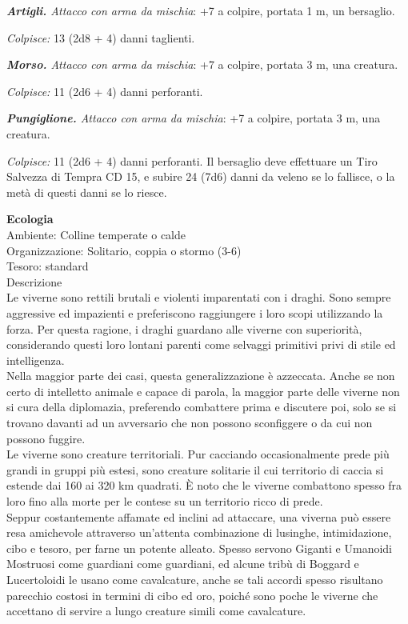 \begin{multicols}{2}
\emph{\textbf{Artigli.} Attacco con arma da mischia}: +7 a colpire, portata 1 m, un bersaglio.

\emph{Colpisce:} 13 (2d8 + 4) danni taglienti.

\emph{\textbf{Morso.} Attacco con arma da mischia}: +7 a colpire, portata 3 m, una creatura.

\emph{Colpisce:} 11 (2d6 + 4) danni perforanti.

\emph{\textbf{Pungiglione.} Attacco con arma da mischia}: +7 a colpire, portata 3 m, una creatura.

\emph{Colpisce:} 11 (2d6 + 4) danni perforanti. Il bersaglio deve effettuare un Tiro Salvezza di Tempra CD 15, e subire 24 (7d6) danni da veleno se lo fallisce, o la metà di questi danni se lo riesce.

\textbf{Ecologia}\\
Ambiente: Colline temperate o calde\\
Organizzazione: Solitario, coppia o stormo (3-6)\\
Tesoro: standard\\
Descrizione\\
Le viverne sono rettili brutali e violenti imparentati con i draghi. Sono sempre aggressive ed impazienti e preferiscono raggiungere i loro scopi utilizzando la forza. Per questa ragione, i draghi guardano alle viverne con superiorità, considerando questi loro lontani parenti come selvaggi primitivi privi di stile ed intelligenza.\\

Nella maggior parte dei casi, questa generalizzazione è azzeccata. Anche se non certo di intelletto animale e capace di parola, la maggior parte delle viverne non si cura della diplomazia, preferendo combattere prima e discutere poi, solo se si trovano davanti ad un avversario che non possono sconfiggere o da cui non possono fuggire.\\

Le viverne sono creature territoriali. Pur cacciando occasionalmente prede più grandi in gruppi più estesi, sono creature solitarie il cui territorio di caccia si estende dai 160 ai 320 km quadrati. È noto che le viverne combattono spesso fra loro fino alla morte per le contese su un territorio ricco di prede.\\


Seppur costantemente affamate ed inclini ad attaccare, una viverna può essere resa amichevole attraverso un'attenta combinazione di lusinghe, intimidazione, cibo e tesoro, per farne un potente alleato. Spesso servono Giganti e Umanoidi Mostruosi come guardiani come guardiani, ed alcune tribù di Boggard e Lucertoloidi le usano come cavalcature, anche se tali accordi spesso risultano parecchio costosi in termini di cibo ed oro, poiché sono poche le viverne che accettano di servire a lungo creature simili come cavalcature.\\


\end{multicols}
